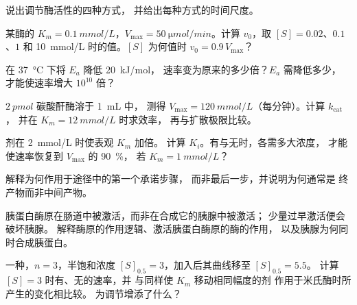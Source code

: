 \begin{exercise}[$\star$]\label{exo:b1:enzymes:4}
说出调节酶活性的四种方式，
并给出每种方式的时间尺度。
\end{exercise}

\begin{exercise}[$\star\star$]\label{exo:b1:enzymes:5}
某酶的 $K_m = \qty{0.1}{mmol/L}$，$V_{\max} =
\qty{50}{\micro mol/min}$。计算 $v_0$，取 $[S] = 0.02$、$0.1$、$1$
和 \qty{10}{mmol/L} 时的值。$[S]$ 为何值时 $v_0 = 0.9\,V_{\max}$？
\end{exercise}

\begin{exercise}[$\star\star$]\label{exo:b1:enzymes:6}
在 \qty{37}{\celsius} 下将 $E_a$ 降低 \qty{20}{kJ/mol}，
速率变为原来的多少倍？$E_a$ 需降低多少，
才能使速率增大 $10^{10}$ 倍？
\end{exercise}

\begin{exercise}[$\star\star$]\label{exo:b1:enzymes:7}
$\qty{2}{pmol}$ 碳酸酐酶溶于 \qty{1}{mL} 中，
测得 $V_{\max} = \qty{120}{mmol/L}$（每分钟）。计算 $k_{\text{cat}}$，
并在 $K_m = \qty{12}{mmol/L}$ 时求效率，
再与扩散极限比较。
\end{exercise}

\begin{exercise}[$\star\star$]\label{exo:b1:enzymes:8}
剂在 \qty{2}{mmol/L} 时使表观 $K_m$ 加倍。
计算 $K_i$。有与无时，各需多大浓度，
才能使速率恢复到 $V_{\max}$ 的 \qty{90}{\%}，
若 $K_m = \qty{1}{mmol/L}$？
\end{exercise}

\begin{exercise}[$\star\star$]\label{exo:b1:enzymes:9}
解释为何作用于途径中的第一个承诺步骤，
而非最后一步，并说明为何通常是
终产物而非中间产物。
\end{exercise}

\begin{exercise}[$\star\star\star$]\label{exo:b1:enzymes:10}
胰蛋白酶原在肠道中被激活，而非在合成它的胰腺中被激活；
少量过早激活便会破坏胰腺。
解释酶原的作用逻辑、激活胰蛋白酶原的酶的作用，
以及胰腺为何同时合成胰蛋白。
\end{exercise}

\begin{exercise}[$\star\star\star$]\label{exo:b1:enzymes:11}
一种，$n = 3$，半饱和浓度 $[S]_{0.5}
= 3$，加入后其曲线移至 $[S]_{0.5} = 5.5$。
计算 $[S] = 3$ 时有、无的速率，并
与同样使 $K_m$ 移动相同幅度的剂
作用于米氏酶时所产生的变化相比较。
为调节增添了什么？
\end{exercise}

